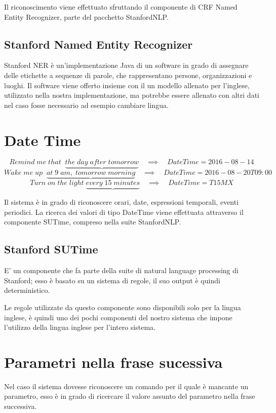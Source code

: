 \documentclass[twoside]{supsistudent}
\begin{document}
Il riconoscimento viene effettuato sfruttando il componente di CRF Named Entity Recognizer, parte del pacchetto StanfordNLP. \cite{stanfordNer}
\subsection{Stanford Named Entity Recognizer}
Stanford NER è un'implementazione Java di un software in grado di assegnare delle etichette a sequenze di parole, che rappresentano persone, organizzazioni e luoghi.
Il software viene offerto insieme con il un modello allenato per l'inglese, utilizzato nella nostra implementazione, ma potrebbe essere allenato con altri dati nel caso fosse necessario ad esempio cambiare lingua.
\section{Date Time}
\begin{center}
\[
Remind\;me\;that\;\;
\underbrace{the\;day\;after\;tomorrow}
\quad\implies\quad DateTime = 2016-08-14
\]
\[
Wake\;me\;up\;\;
\underbrace{at\;9\;am,\;tomorrow\;morning}
\quad\implies\quad DateTime = 2016-08-20T09:00
\]
\[
Turn\;on\;the\;light\;
\underbrace{every\;15\;minutes}
\quad\implies\quad DateTime = T15MX
\]
\end{center}
Il sistema è in grado di riconoscere orari, date, espressioni temporali, eventi periodici. La ricerca dei valori di tipo DateTime viene effettuata attraverso il componente SUTime, compreso nella suite StanfordNLP.\cite{stanfordSUTime}

\subsection{Stanford SUTime}
E' un componente che fa parte della suite di natural language processing di Stanford; esso è basato su un sistema di regole, il suo output è quindi deterministico.

Le regole utilizzate da questo componente sono disponibili solo per la lingua inglese, è quindi uno dei pochi componenti del nostro sistema che impone l'utilizzo della lingua inglese per l'intero sistema.

\newpage
\section{Parametri nella frase sucessiva}
Nel caso il sistema dovesse riconoscere un comando per il quale è mancante un parametro, esso è in grado di ricercare il valore assunto del parametro nella frase successiva.
\end{document}

